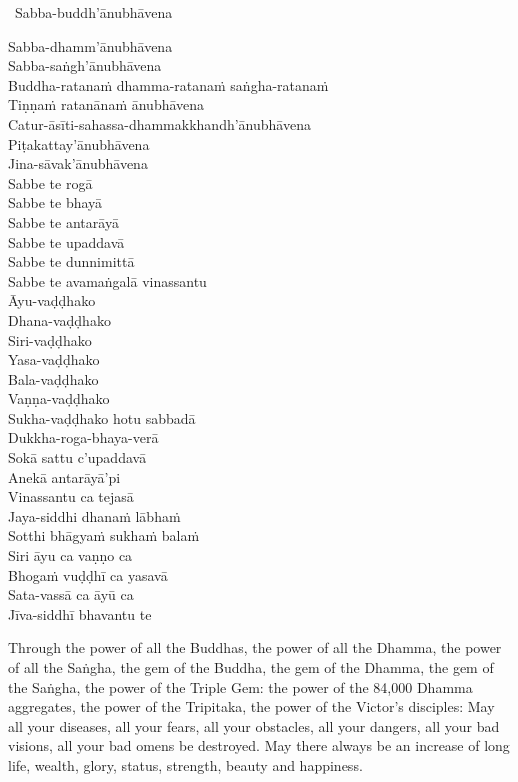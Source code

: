 \begin{pali-leader}
  \anglebracketleft\ \hspace{-0.5mm}Sabba-buddh'ānubhāvena \hspace{-0.5mm}\anglebracketright\
\end{pali-leader}
\begin{pali-hangtogether}
  Sabba-dhamm'ānubhāvena\\
  Sabba-saṅgh'ānubhāvena\\
  Buddha-ratanaṁ dhamma-ratanaṁ saṅgha-ratanaṁ\\
  Tiṇṇaṁ ratanānaṁ ānubhāvena\\
  Catur-āsīti-sahassa-dhammakkhandh'ānubhāvena\\
  Piṭakattay'ānubhāvena\\
  Jina-sāvak'ānubhāvena\\
  Sabbe te rogā\\
  Sabbe te bhayā\\
  Sabbe te antarāyā\\
  Sabbe te upaddavā\\
  Sabbe te dunnimittā\\
  Sabbe te avamaṅgalā vinassantu\\
  Āyu-vaḍḍhako\\
  Dhana-vaḍḍhako\\
  Siri-vaḍḍhako\\
  Yasa-vaḍḍhako\\
  Bala-vaḍḍhako\\
  Vaṇṇa-vaḍḍhako\\
  Sukha-vaḍḍhako hotu sabbadā\\
  Dukkha-roga-bhaya-verā\\
  Sokā sattu c'upaddavā\\
  Anekā antarāyā'pi\\
  Vinassantu ca tejasā\\
  Jaya-siddhi dhanaṁ lābhaṁ\\
  Sotthi bhāgyaṁ sukhaṁ balaṁ\\
  Siri āyu ca vaṇṇo ca\\
  Bhogaṁ vuḍḍhī ca yasavā\\
  Sata-vassā ca āyū ca\\
  Jīva-siddhī bhavantu te
\end{pali-hangtogether}

\begin{english-verses}
  Through the power of all the Buddhas, the power of all the Dhamma, the power of all the Saṅgha, the gem of the Buddha, the gem of the Dhamma, the gem of the Saṅgha, the power of the Triple Gem: the power of the 84,000 Dhamma aggregates, the power of the Tripitaka, the power of the Victor's disciples: May all your diseases, all your fears, all your obstacles, all your dangers, all your bad visions, all your bad omens be destroyed. May there always be an increase of long life, wealth, glory, status, strength, beauty and happiness.
\end{english-verses}

